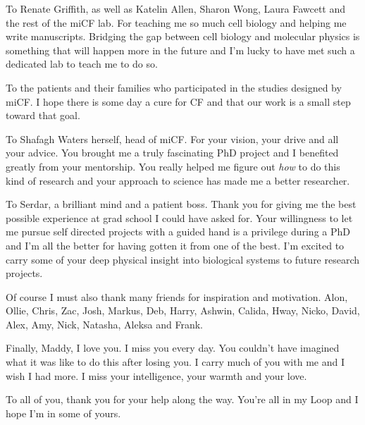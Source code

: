 To Renate Griffith, as well as Katelin Allen, Sharon Wong, Laura Fawcett and the rest of the miCF lab. For teaching me so much cell biology and helping me write manuscripts. Bridging the gap between cell biology and molecular physics is something that will happen more in the future and I'm lucky to have met such a dedicated lab to teach me to do so.

To the patients and their families who participated in the studies designed by miCF. I hope there is some day a cure for CF and that our work is a small step toward that goal.

To Shafagh Waters herself, head of miCF. For your vision, your drive and all your advice. You brought me a truly fascinating PhD project and I benefited greatly from your mentorship. You really helped me figure out \textit{how} to do this kind of research and your approach to science has made me a better researcher.

To Serdar, a brilliant mind and a patient boss. Thank you for giving me the best possible experience at grad school I could have asked for. Your willingness to let me pursue self directed projects with a guided hand is a privilege during a PhD and I'm all the better for having gotten it from one of the best. I'm excited to carry some of your deep physical insight into biological systems to future research projects. 

Of course I must also thank many friends for inspiration and motivation. Alon, Ollie, Chris, Zac, Josh, Markus, Deb, Harry, Ashwin, Calida, Hway, Nicko, David, Alex, Amy, Nick, Natasha, Aleksa and Frank.

Finally, Maddy, I love you. I miss you every day. You couldn't have imagined what it was like to do this after losing you. I carry much of you with me and I wish I had more. I miss your intelligence, your warmth and your love.

To all of you, thank you for your help along the way. You're all in my Loop \cite{hofstadter2007} and I hope I'm in some of yours.


